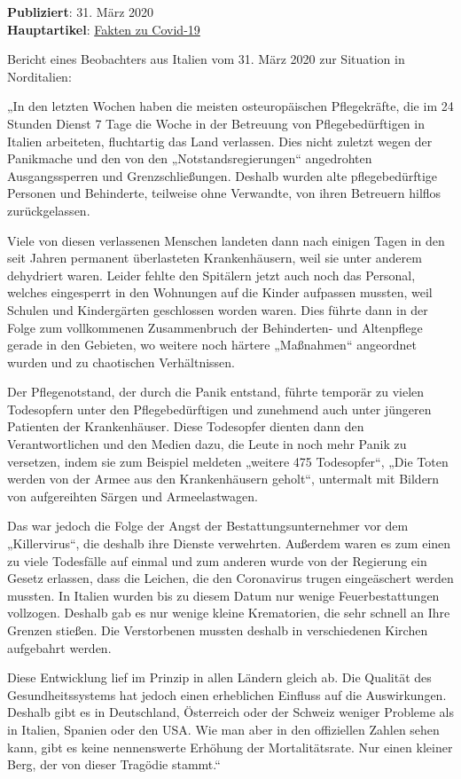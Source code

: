 \textbf{Publiziert}: 31. März 2020\\
\textbf{Hauptartikel}:
\href{https://swprs.org/covid-19-hinweis-ii/}{Fakten zu Covid-19}

Bericht eines Beobachters aus Italien vom 31. März 2020 zur Situation in
Norditalien:

„In den letzten Wochen haben die meisten osteuropäischen Pflegekräfte,
die im 24 Stunden Dienst 7 Tage die Woche in der Betreuung von
Pflegebedürftigen in Italien arbeiteten, fluchtartig das Land verlassen.
Dies nicht zuletzt wegen der Panikmache und den von den
„Notstandsregierungen`` angedrohten Ausgangssperren und
Grenzschließungen. Deshalb wurden alte pflegebedürftige Personen und
Behinderte, teilweise ohne Verwandte, von ihren Betreuern hilflos
zurückgelassen.

Viele von diesen verlassenen Menschen landeten dann nach einigen Tagen
in den seit Jahren permanent überlasteten Krankenhäusern, weil sie unter
anderem dehydriert waren. Leider fehlte den Spitälern jetzt auch noch
das Personal, welches eingesperrt in den Wohnungen auf die Kinder
aufpassen mussten, weil Schulen und Kindergärten geschlossen worden
waren. Dies führte dann in der Folge zum vollkommenen Zusammenbruch der
Behinderten- und Altenpflege gerade in den Gebieten, wo weitere noch
härtere „Maßnahmen`` angeordnet wurden und zu chaotischen Verhältnissen.

Der Pflegenotstand, der durch die Panik entstand, führte temporär zu
vielen Todesopfern unter den Pflegebedürftigen und zunehmend auch unter
jüngeren Patienten der Krankenhäuser. Diese Todesopfer dienten dann den
Verantwortlichen und den Medien dazu, die Leute in noch mehr Panik zu
versetzen, indem sie zum Beispiel meldeten „weitere 475 Todesopfer``,
„Die Toten werden von der Armee aus den Krankenhäusern geholt``,
untermalt mit Bildern von aufgereihten Särgen und Armeelastwagen.

Das war jedoch die Folge der Angst der Bestattungsunternehmer vor dem
„Killervirus``, die deshalb ihre Dienste verwehrten. Außerdem waren es
zum einen zu viele Todesfälle auf einmal und zum anderen wurde von der
Regierung ein Gesetz erlassen, dass die Leichen, die den Coronavirus
trugen eingeäschert werden mussten. In Italien wurden bis zu diesem
Datum nur wenige Feuerbestattungen vollzogen. Deshalb gab es nur wenige
kleine Krematorien, die sehr schnell an Ihre Grenzen stießen. Die
Verstorbenen mussten deshalb in verschiedenen Kirchen aufgebahrt werden.

Diese Entwicklung lief im Prinzip in allen Ländern gleich ab. Die
Qualität des Gesund­heits­systems hat jedoch einen erheblichen Einfluss
auf die Auswirkungen. Deshalb gibt es in Deutschland, Österreich oder
der Schweiz weniger Probleme als in Italien, Spanien oder den USA. Wie
man aber in den offiziellen Zahlen sehen kann, gibt es keine
nennenswerte Erhöhung der Mortalitätsrate. Nur einen kleiner Berg, der
von dieser Tragödie stammt.``

